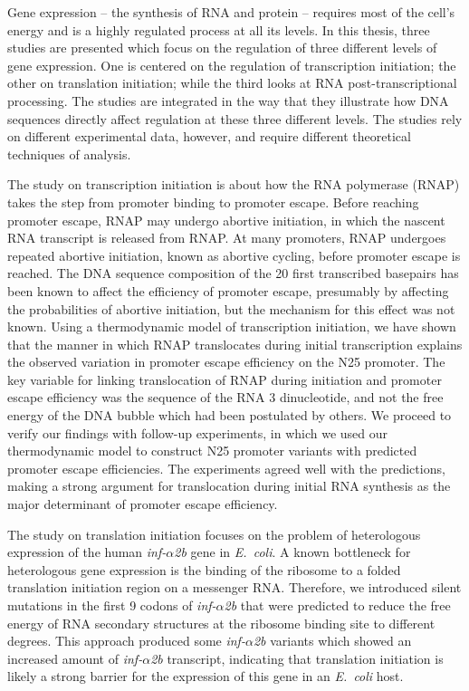 Gene expression -- the synthesis of RNA and protein -- requires most of the
cell's energy and is a highly regulated process at all its levels. In this
thesis, three studies are presented which focus on the regulation of three
different levels of gene expression. One is centered on the regulation of
transcription initiation; the other on translation initiation; while the
third looks at RNA post-transcriptional processing. The studies are integrated
in the way that they illustrate how DNA sequences directly affect regulation at
these three different levels. The studies rely on different experimental data,
however, and require different theoretical techniques of analysis.

The study on transcription initiation is about how the RNA polymerase (RNAP)
takes the step from promoter binding to promoter escape. Before reaching
promoter escape, RNAP may undergo abortive initiation, in which the nascent RNA
transcript is released from RNAP. At many promoters, RNAP undergoes repeated
abortive initiation, known as abortive cycling, before promoter escape is
reached. The DNA sequence composition of the 20 first transcribed basepairs has
been known to affect the efficiency of promoter escape, presumably by affecting the
probabilities of abortive initiation, but the mechanism for this effect was not
known. Using a thermodynamic model of transcription initiation, we have shown
that the manner in which RNAP translocates during initial
transcription explains the observed variation in promoter escape efficiency on
the N25 promoter. The key variable for linking translocation of RNAP during
initiation and promoter escape efficiency was the sequence of the RNA 3\ppp
dinucleotide, and not the free energy of the DNA bubble which had been
postulated by others. We proceed to verify our findings with follow-up
experiments, in which we used our thermodynamic model to construct N25 promoter
variants with predicted promoter escape efficiencies. The experiments agreed
well with the predictions, making a strong argument for translocation during
initial RNA synthesis as the major determinant of promoter escape efficiency.

The study on translation initiation focuses on the problem of heterologous
expression of the human \textit{inf-$\alpha$2b} gene in \textit{E.\ coli}. A
known bottleneck for heterologous gene expression is the binding of the
ribosome to a folded translation initiation region on a messenger RNA.
Therefore, we introduced silent mutations in the first 9 codons of
\textit{inf-$\alpha$2b} that were predicted to reduce the free energy of RNA
secondary structures at the ribosome binding site to different degrees. This
approach produced some \textit{inf-$\alpha$2b} variants which showed an 
increased amount of \textit{inf-$\alpha$2b} transcript, indicating that
translation initiation is likely a strong barrier for the expression of this
gene in an \textit{E.\ coli} host.

